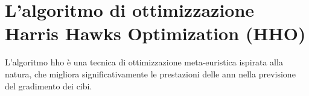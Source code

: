 \section{L'algoritmo di ottimizzazione Harris Hawks Optimization (HHO)}
\noindent

L'algoritmo \gls{hho} è una tecnica di ottimizzazione meta-euristica ispirata alla natura, che migliora significativamente le prestazioni delle \gls{ann} nella previsione del gradimento dei cibi. 

